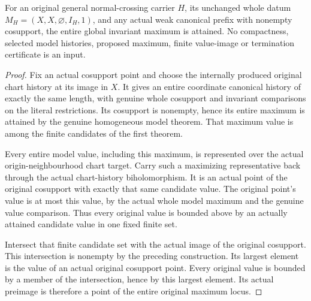 \begin{theorem}
\label{hir:general-nc-actual-entire-global-maximum}
\leanok
For an original general normal-crossing carrier $H$, its unchanged
whole datum $M_H=(X,X,\varnothing,I_H,1)$, and any actual weak canonical
prefix with nonempty cosupport, the entire global invariant maximum
is attained. No compactness, selected model histories, proposed maximum,
finite value-image or termination certificate is an input.
\end{theorem}
\begin{proof}
Fix an actual cosupport point and choose the internally produced
original chart history at its image in $X$. It gives an entire
coordinate canonical history of exactly the same length, with genuine
whole cosupport and invariant comparisons on the literal restrictions.
Its cosupport is nonempty, hence its entire maximum is attained by the
genuine homogeneous model theorem. That maximum value is among the
finite candidates of the first theorem.

Every entire model value, including this maximum, is represented over
the actual origin-neighbourhood chart target. Carry such a maximizing
representative back through the actual chart-history biholomorphism.
It is an actual point of the original cosupport with exactly that same
candidate value. The original point's value is at most this value,
by the actual whole model maximum and the genuine value comparison.
Thus every original value is bounded above by an actually attained
candidate value in one fixed finite set.

Intersect that finite candidate set with the actual image of the
original cosupport. This intersection is nonempty by the preceding
construction. Its largest element is the value of an actual original
cosupport point. Every original value is bounded by a member of the
intersection, hence by this largest element. Its actual preimage is
therefore a point of the entire original maximum locus.
\end{proof}

